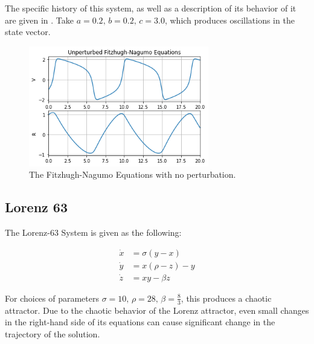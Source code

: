 \documentclass[12pt]{article}
\begin{document}
The specific history of this system, as well as a description of its behavior of it are given in \cite{ramsay}. Take $a=0.2,\, b=0.2,\, c=3.0$, which produces oscillations in the state vector.

\begin{figure}[ht]
  \centering
  \includegraphics[width=0.7\textwidth]{fn-unperturbed.png}
  \caption{The Fitzhugh-Nagumo Equations with no perturbation.}
\end{figure}



\subsection{Lorenz 63}

The Lorenz-63 System is given as the following:

\begin{align*}
  \dot{x} &= \sigma (y - x)\\
  \dot{y} &= x ( \rho - z ) - y\\
  \dot{z} &= x y - \beta z
\end{align*}

For choices of parameters $\sigma=10,\, \rho=28,\, \beta=\frac{8}{3}$, this produces a chaotic attractor. Due to the chaotic behavior of the Lorenz attractor, even small changes in the right-hand side of its equations can cause significant change in the trajectory of the solution.
\end{document}
